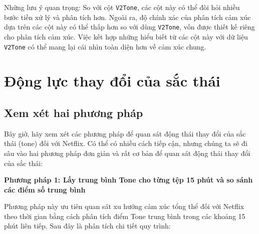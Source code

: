 Những lưu ý quan trọng: So với cột \texttt{V2Tone}, các cột này có thể đòi hỏi nhiều bước tiền xử lý và phân tích hơn. Ngoài ra, độ chính xác của phân tích cảm xúc dựa trên các cột này có thể thấp hơn so với dùng \texttt{V2Tone}, vốn được thiết kế riêng cho phân tích cảm xúc. Việc kết hợp những hiểu biết từ các cột này với dữ liệu \texttt{V2Tone} có thể mang lại cái nhìn toàn diện hơn về cảm xúc chung.

\section{Động lực thay đổi của sắc thái}

\subsection{Xem xét hai phương pháp}

Bây giờ, hãy xem xét các phương pháp để quan sát động thái thay đổi của sắc thái (tone) đối với Netflix. Có thể có nhiều cách tiếp cận, nhưng chúng ta sẽ đi sâu vào hai phương pháp đơn giản và rất cơ bản để quan sát động thái thay đổi của sắc thái:

\textbf{Phương pháp 1: Lấy trung bình Tone cho từng tệp 15 phút và so sánh các điểm số trung bình}

Phương pháp này ưu tiên quan sát xu hướng cảm xúc tổng thể đối với Netflix theo thời gian bằng cách phân tích điểm Tone trung bình trong các khoảng 15 phút liên tiếp. Sau đây là phân tích chi tiết quy trình:

